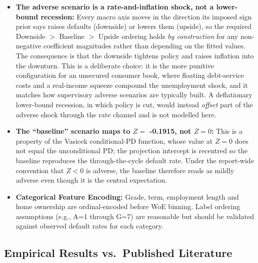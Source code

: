 \documentclass[11pt,a4paper]{article}
\begin{document}
\begin{itemize}
    \item \textbf{The adverse scenario is a rate-and-inflation shock, not a lower-bound recession:} Every macro axis moves in the direction its imposed sign prior says raises defaults (downside) or lowers them (upside), so the required Downside $>$ Baseline $>$ Upside ordering holds \emph{by construction} for any non-negative coefficient magnitudes rather than depending on the fitted values. The consequence is that the downside tightens policy and raises inflation into the downturn. This is a deliberate choice: it is the more punitive configuration for an unsecured consumer book, where floating debt-service costs and a real-income squeeze compound the unemployment shock, and it matches how supervisory adverse scenarios are typically built. A deflationary lower-bound recession, in which policy is cut, would instead \emph{offset} part of the adverse shock through the rate channel and is not modelled here.
    \item \textbf{The ``baseline'' scenario maps to $Z = $ -0.1915, not $Z=0$:} This is a property of the Vasicek conditional-PD function, whose value at $Z=0$ does not equal the unconditional PD; the projection intercept is recentred so the baseline reproduces the through-the-cycle default rate. Under the report-wide convention that $Z<0$ is adverse, the baseline therefore reads as mildly adverse even though it is the central expectation.
    \item \textbf{Categorical Feature Encoding:} Grade, term, employment length and home ownership are ordinal-encoded before WoE binning. Label ordering assumptions (e.g., A=1 through G=7) are reasonable but should be validated against observed default rates for each category.
\end{itemize}

\subsection{Empirical Results vs.\ Published Literature}
\label{subsec:benchmarks}
\end{document}
